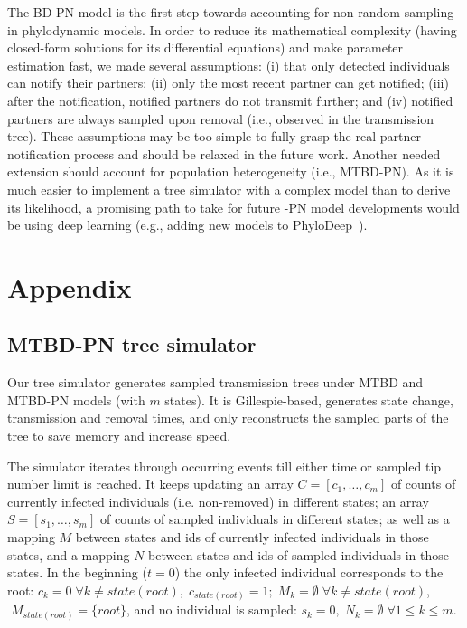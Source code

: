 \documentclass[a4paper,10pt]{article}
\begin{document}
The BD-PN model is the first step towards accounting for non-random sampling in phylodynamic models. In order to reduce its mathematical complexity (having closed-form solutions for its differential equations) and make parameter estimation fast, we made several assumptions: (i) that only detected individuals can notify their partners; (ii) only the most recent partner can get notified; (iii) after the notification, notified partners do not transmit further; and (iv) notified partners are always sampled upon removal (i.e., observed in the transmission tree). These assumptions may be too simple to fully grasp the real partner notification process and should be relaxed in the future work. Another needed extension should account for population heterogeneity (i.e., MTBD-PN). As it is much easier to implement a tree simulator with a complex model than to derive its likelihood, a promising path to take for future -PN model developments would be using deep learning (e.g., adding new models to PhyloDeep~\citep{Voznica2021}). 






\section{Appendix}


\subsection{MTBD-PN tree simulator}

Our tree simulator generates sampled transmission trees under MTBD and MTBD-PN models (with $m$ states). It is Gillespie-based, generates state change, transmission and removal times, and only reconstructs the sampled parts of the tree to save memory and increase speed.  

The simulator iterates through occurring events till either time or sampled tip number limit is reached. 
It keeps updating an array $C = [c_1, \ldots, c_m]$ of counts of currently infected individuals (i.e. non-removed) in different states; an array $S = [s_1, \ldots, s_m]$ of counts of sampled individuals in different states; as well as a mapping $M$ between states and ids of currently infected individuals in those states, and a mapping $N$ between states and ids of sampled individuals in those states.  In the beginning ($t=0$) the only infected individual corresponds to the root: $c_k = 0 \;\forall k \neq state(root), \;c_{state(root)} = 1; \;M_k = \emptyset \; \forall k \neq state(root)$, $ \; M_{state(root)} = \{root\}$, and no individual is sampled: $s_k=0,\;N_k = \emptyset \; \forall 1 \leq k \leq m$.
\end{document}
